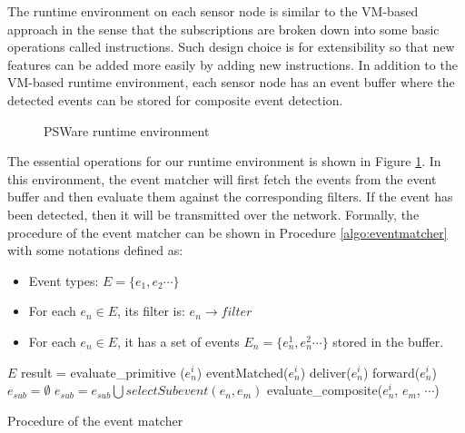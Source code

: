 \begin{enumerate}
{The runtime environment on each sensor node is similar to the VM-based approach \cite{mate} in the sense that the subscriptions are broken down into some basic operations called instructions. Such design choice is for extensibility so that new features can be added more easily by adding new instructions. In addition to the VM-based runtime environment, each sensor node has an event buffer where the detected events can be stored for composite event detection.

\begin{figure}
\centering
{}
\caption{PSWare runtime environment}
\label{fig:eventdetectionframework2}
\end{figure}
The essential operations for our runtime environment is shown in Figure \ref{fig:eventdetectionframework2}. In this environment, the event matcher will first fetch the events from the event buffer and then evaluate them against the corresponding filters. If the event has been detected, then it will be transmitted over the network. Formally, the procedure of the event matcher can be shown in Procedure \ref{algo:eventmatcher} with some notations defined as:
\begin{itemize}
\item Event types: \(E=\{e_1, e_2 \cdots \}\)
\item For each \(e_n\in E\), its filter is: \(e_n\rightarrow filter\)
\item For each \(e_n\in E\), it has a set of events \(E_n=\{e_n^1, e_n^2 \cdots \}\) stored in the buffer.
\end{itemize}

\begin{algorithm}
\begin{algorithmic}
\REQUIRE \(E\)
				\STATE result = evaluate\_primitive (\(e_n^i\))
					\STATE eventMatched(\(e_n^i\))
						\STATE deliver(\(e_n^i\))
					\ELSE
						\STATE forward(\(e_n^i\))
					\ENDIF
				\ENDIF
			\ELSE
				\STATE \(e_{sub} = \emptyset \)
					\STATE \(e_{sub} = e_{sub}\bigcup selectSubevent (e_n, e_m)\)
				\ENDFOR
					\STATE evaluate\_composite(\(e_n^i\), \(e_m\), \(\cdots \))
				\ENDFOR
			\ENDIF
		\ENDFOR
	\ENDFOR
\end{algorithmic}
\caption{Procedure of the event matcher}
\label{algo:eventmatcher}
\end{algorithm}

}
\end{enumerate}
